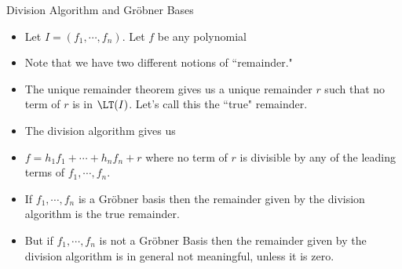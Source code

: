 \documentclass{beamer}
\begin{document}

\begin{frame}{Division Algorithm and Gr\"{o}bner Bases}

\begin{itemize}
  \item Let $I = (f_1, \cdots, f_n)$. Let $f$ be any polynomial
  \item Note that we have two different notions of ``remainder."
  \item The unique remainder theorem gives us a unique remainder $r$ such
  that no term of $r$ is in $\LT(I)$. Let's
  call this the ``true" remainder.
  \item The division algorithm gives us
  \item $f = h_1f_1 + \cdots + h_n f_n + r$ where no term of $r$ is divisible
  by any of the leading terms of $f_1,\cdots,f_n$.
  \item If $f_1,\cdots,f_n$ is a Gr\"{o}bner basis then the remainder given by
  the division algorithm is the true remainder.
  \item But if $f_1,\cdots,f_n$ is not a Gr\"{o}bner Basis then the remainder given
  by the division algorithm is in general not meaningful, unless it is zero.

\end{itemize}
\end{frame}
\end{document}
